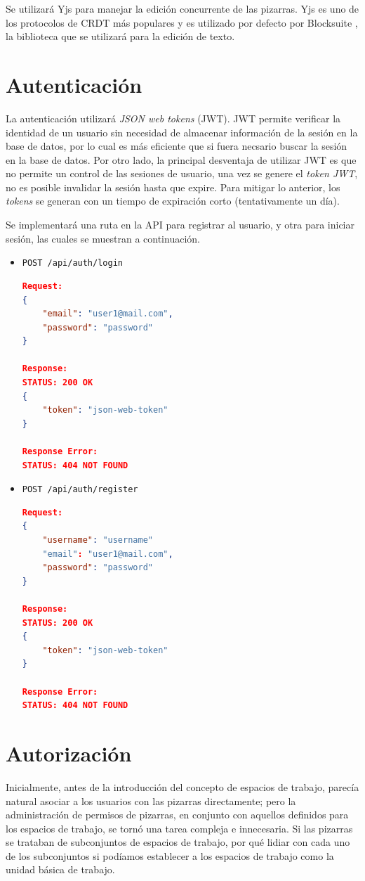 \documentclass[a4paper, oneside, final]{scrartcl}
\begin{document}
Se utilizará Yjs para manejar la edición concurrente de las pizarras. Yjs es uno de los protocolos de CRDT más populares y es utilizado por defecto por Blocksuite \cite{unknown-author-no-date}, la biblioteca que se utilizará para la edición de texto. 

\section{Autenticación}

La autenticación utilizará \textit{JSON web tokens} (JWT). JWT permite verificar la identidad de un usuario sin necesidad de almacenar información de la sesión en la base de datos, por lo cual es más eficiente que si fuera necsario buscar la sesión en la base de datos. Por otro lado, la principal desventaja de utilizar JWT es que no permite un control de las sesiones de usuario, una vez se genere el \textit{token JWT}, no es posible invalidar la sesión hasta que expire. Para mitigar lo anterior, los \textit{tokens} se generan con un tiempo de expiración corto (tentativamente un día). 

Se implementará una ruta en la API para registrar al usuario, y otra para iniciar sesión, las cuales se muestran a continuación.

\begin{itemize}
    \item \texttt{POST /api/auth/login}
\begin{lstlisting}[language=json,firstnumber=1]
Request:
{
    "email": "user1@mail.com",
    "password": "password"
}

Response:
STATUS: 200 OK
{
    "token": "json-web-token"
}

Response Error:
STATUS: 404 NOT FOUND
\end{lstlisting}
    
\item \texttt{POST /api/auth/register}
\begin{lstlisting}[language=json,firstnumber=1]
Request:
{
    "username": "username"
    "email": "user1@mail.com",
    "password": "password"
}

Response:
STATUS: 200 OK
{
    "token": "json-web-token"
}

Response Error:
STATUS: 404 NOT FOUND
\end{lstlisting}

\end{itemize}

\section{Autorización}
Inicialmente, antes de la introducci\'on del concepto de espacios de trabajo, parec\'ia natural asociar a los usuarios con las pizarras directamente; pero la administraci\'on de permisos de pizarras, en conjunto con aquellos definidos para los espacios de trabajo, se torn\'o una tarea compleja e innecesaria. Si las pizarras se trataban de subconjuntos de espacios de trabajo, por qu\'e lidiar con cada uno de los subconjuntos si pod\'iamos establecer a los espacios de trabajo como la unidad b\'asica de trabajo.
\end{document}
